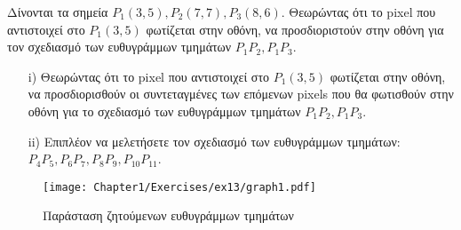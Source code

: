 \begin{exercise}
	Δίνονται τα σημεία $P_1 (3,5), P_2(7,7), P_3 (8,6)$. Θεωρώντας ότι το pixel που αντιστοιχεί στο $P_1(3,5)$ φωτίζεται στην οθόνη, να προσδιοριστούν στην οθόνη για τον σχεδιασμό των ευθυγράμμων τμημάτων $P_1 P_2, P_1 P_3$.

\begin{enumerate}
  \item[i)] Θεωρώντας ότι το pixel που αντιστοιχεί στο $P_1 (3,5) $ φωτίζεται στην οθόνη, να προσδιορισθούν οι συντεταγμένες των επόμενων pixels που θα φωτισθούν στην οθόνη για το σχεδιασμό των ευθυγράμμων τμημάτων $P_1 P_2, P_1 P _3$.
  \item[ii)]   Επιπλέον να μελετήσετε τον σχεδιασμό των ευθυγράμμων τμημάτων: \newline 
	$P_4 P_5, P_6 P_7, P_8 P_9, P_{10} P_{11}$.
\end{enumerate}

\begin{figure}[hbt]
  \begin{center}
	\texttt{[image: Chapter1/Exercises/ex13/graph1.pdf]}
  \end{center}
  \caption{Παράσταση ζητούμενων ευθυγράμμων τμημάτων}
\end{figure}


		
\end{exercise}

